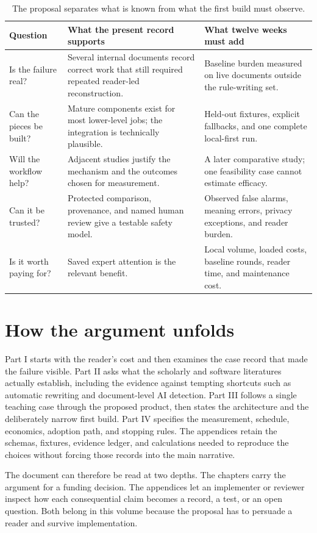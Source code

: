 \begin{table}[H]
\centering
\small
\begin{tabularx}{\textwidth}{@{}p{}L p{0.25\textwidth}@{}}
\toprule
Question & What the present record supports & What twelve weeks must add \\
\midrule
Is the failure real? & Several internal documents record correct work that
still required repeated reader-led reconstruction. & Baseline burden measured
on live documents outside the rule-writing set. \\
Can the pieces be built? & Mature components exist for most lower-level jobs;
the integration is technically plausible. & Held-out fixtures, explicit
fallbacks, and one complete local-first run. \\
Will the workflow help? & Adjacent studies justify the mechanism and the
outcomes chosen for measurement. & A later comparative study; one feasibility
case cannot estimate efficacy. \\
Can it be trusted? & Protected comparison, provenance, and named human review
give a testable safety model. & Observed false alarms, meaning errors, privacy
exceptions, and reader burden. \\
Is it worth paying for? & Saved expert attention is the relevant benefit. &
Local volume, loaded costs, baseline rounds, reader time, and maintenance
cost. \\
\bottomrule
\end{tabularx}
\caption{The proposal separates what is known from what the first build must
observe.}
\label{tab:orientation-route}
\end{table}

\section*{How the argument unfolds}

Part I starts with the reader's cost and then examines the case record that
made the failure visible. Part II asks what the scholarly and software
literatures actually establish, including the evidence against tempting
shortcuts such as automatic rewriting and document-level AI detection. Part
III follows a single teaching case through the proposed product, then states
the architecture and the deliberately narrow first build. Part IV specifies
the measurement, schedule, economics, adoption path, and stopping rules. The
appendices retain the schemas, fixtures, evidence ledger, and calculations
needed to reproduce the choices without forcing those records into the main
narrative.

The document can therefore be read at two depths. The chapters carry the
argument for a funding decision. The appendices let an implementer or reviewer
inspect how each consequential claim becomes a record, a test, or an open
question. Both belong in this volume because the proposal has to persuade a
reader and survive implementation.
